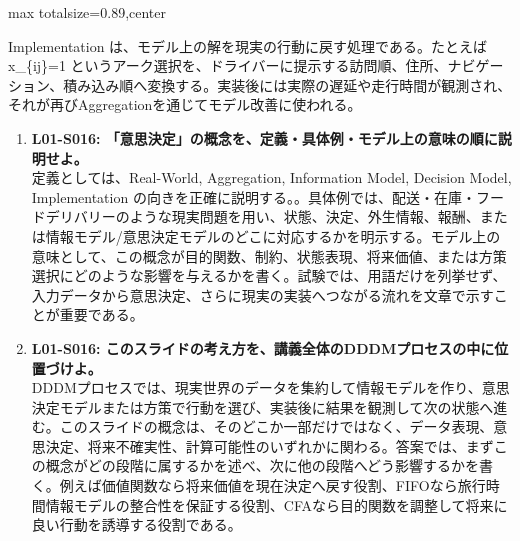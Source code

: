 \begin{minipage}[t]{0.58\textwidth}
\begin{adjustbox}{max totalsize={\textwidth}{0.89\textheight},center}
\begin{minipage}{\textwidth}
Implementation は、モデル上の解を現実の行動に戻す処理である。たとえば x\_\{ij\}=1 というアーク選択を、ドライバーに提示する訪問順、住所、ナビゲーション、積み込み順へ変換する。実装後には実際の遅延や走行時間が観測され、それが再びAggregationを通じてモデル改善に使われる。\par{}\begin{enumerate}\item \textbf{L01-S016: 「意思決定」の概念を、定義・具体例・モデル上の意味の順に説明せよ。}\\定義としては、Real-World, Aggregation, Information Model, Decision Model, Implementation の向きを正確に説明する。。具体例では、配送・在庫・フードデリバリーのような現実問題を用い、状態、決定、外生情報、報酬、または情報モデル/意思決定モデルのどこに対応するかを明示する。モデル上の意味として、この概念が目的関数、制約、状態表現、将来価値、または方策選択にどのような影響を与えるかを書く。試験では、用語だけを列挙せず、入力データから意思決定、さらに現実の実装へつながる流れを文章で示すことが重要である。\item \textbf{L01-S016: このスライドの考え方を、講義全体のDDDMプロセスの中に位置づけよ。}\\DDDMプロセスでは、現実世界のデータを集約して情報モデルを作り、意思決定モデルまたは方策で行動を選び、実装後に結果を観測して次の状態へ進む。このスライドの概念は、そのどこか一部だけではなく、データ表現、意思決定、将来不確実性、計算可能性のいずれかに関わる。答案では、まずこの概念がどの段階に属するかを述べ、次に他の段階へどう影響するかを書く。例えば価値関数なら将来価値を現在決定へ戻す役割、FIFOなら旅行時間情報モデルの整合性を保証する役割、CFAなら目的関数を調整して将来に良い行動を誘導する役割である。\end{enumerate}
\end{minipage}
\end{adjustbox}
\end{minipage}


